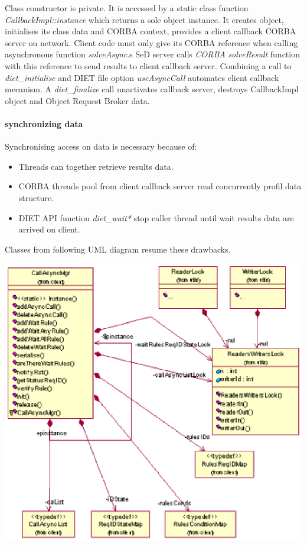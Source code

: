   Class constructor is private. It is accessed by a static class function
  \emph{CallbackImpl::instance} which returns a sole object instance. It
  creates object, initialises its class data and CORBA context, provides a
  client callback CORBA server on network.
  Client code must only give its CORBA reference when calling asynchronous
  function \emph{solveAsync}.s
  SeD server calls \emph{CORBA} \emph{solveResult} function with this
  reference to send results to client callback server.
  Combining  a call to \emph{diet\_initialise} and DIET file option
  \emph{useAsyncCall} automates client callback mecanism.
  A \emph{diet\_finalize} call unactivates callback server, destroys
  CallbackImpl object and Object Request Broker data.

  \paragraph{synchronizing data}
  Synchronising access on data is necessary because of:
  \begin{itemize}
  \item Threads can together retrieve results data.
  \item CORBA threads pool from client callback server read concurrently
  profil data structure.
  \item DIET API function \emph{diet\_wait*} stop caller thread until wait
  results data are arrived on client.
  \end{itemize}
  Classes from following UML diagram resume these drawbacks.

  \includegraphics{./fig/CallBackSynchronisationClassDiagram2.ps}

